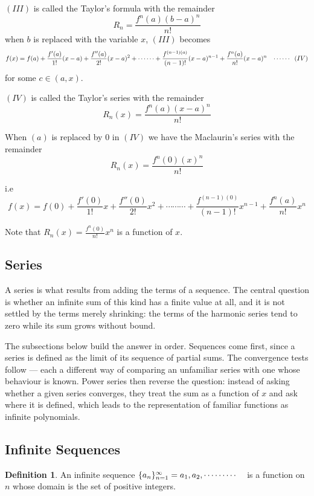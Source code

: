 \documentclass[11pt,a4paper]{article}
\theoremstyle{definition}
\newtheorem{defn}[thm]{Definition}
\begin{document}
$(III)$ is called the Taylor's formula with the remainder $$R_n = \frac{f^n(a) (b - a)^n}{n!}$$ when $b$ is replaced with the variable $x$, $(III)$ becomes
$$f(x) = f(a) + \frac{f'(a)}{1!}(x - a) + \frac{f''(a)}{2!}(x - a)^2 + \cdots\cdots + \frac{f^{(n-1)(a)}}{(n-1)!}(x - a)^{n-1} + \frac{f^n(a)}{n!}(x - a)^n\hspace{0.3cm}\cdots\cdots\hspace{0.2cm} (IV)$$
for some $c \in (a,x)$.


$(IV)$ is called the Taylor's series with the remainder  $$R_n(x) = \frac{f^n(a) (x - a)^n}{n!}$$


When $(a)$ is replaced by 0 in $(IV)$ we have the Maclaurin's series with the remainder $$R_n(x) = \frac{f^n(0) (x )^n}{n!}$$

i.e
$$f(x) = f(0) + \frac{f'(0)}{1!}x  + \frac{f''(0)}{2!}x^2 + \cdots\cdots\cdots + \frac{f^{(n-1)(0)}}{(n-1)!}x^{n-1} + \frac{f^n(a)}{n!}x^n$$

Note that $\displaystyle{R_n(x) = \frac{f^n(0)}{n!}x^n}$ is a function of $x$.


\subsection{Series}

A series is what results from adding the terms of a sequence. The central
question is whether an infinite sum of this kind has a finite value at all, and
it is not settled by the terms merely shrinking: the terms of the harmonic
series tend to zero while its sum grows without bound.

The subsections below build the answer in order. Sequences come first, since a
series is defined as the limit of its sequence of partial sums. The convergence
tests follow --- each a different way of comparing an unfamiliar series with one
whose behaviour is known. Power series then reverse the question: instead of
asking whether a given series converges, they treat the sum as a function of $x$
and ask where it is defined, which leads to the representation of familiar
functions as infinite polynomials.


\subsection{Infinite Sequences}

\begin{defn}


An infinite sequence $\{a_n\}^{\infty}_{n=1} = a_1, a_2,\cdots\cdots\cdots\hspace{0.3cm}$ is a function on $n$ whose domain is the set of positive integers.
\end{defn}
\end{document}
